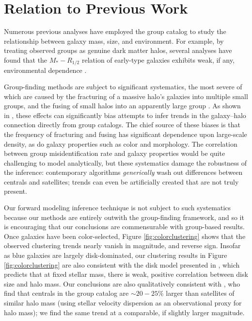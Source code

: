 \documentclass[usenatbib,usegraphicx,letterpaper]{mn2e}
\newcommand{\rhalf}{R_{1/2}}
\newcommand{\mstar}{M_{\ast}}
\begin{document}
\section{Relation to Previous Work}
\label{sec:previous_work}

Numerous previous analyses have employed the \citet{yang_etal05b} group catalog to study the relationship between galaxy mass, size, and environment. For example, by treating observed groups as genuine dark matter halos, several analyses have found that the $\mstar-\rhalf$ relation of early-type galaxies exhibits weak, if any, environmental dependence \citep{weinmann_etal08,huertas_company_etal13b,shankar_etal14}.


Group-finding methods are subject to significant systematics, the most severe of which are caused by the fracturing of a massive halo's galaxies into multiple small groups, and the fusing of small halos into an apparently large group \citep{duarte_mamon14}. As shown in \citet{campbell_etal15}, these effects can significantly bias attempts to infer trends in the galaxy--halo connection directly from group catalogs. The chief source of these  biases is that the frequency of fracturing and fusing has significant dependence upon large-scale density, as do galaxy properties such as color and morphology. The correlation between group misidentification rate and galaxy properties would be quite challenging to model analytically, but these systematics damage the robustness of the inference: contemporary algorithms {\em generically} wash out differences between centrals and satellites; trends can even be artificially created that are not truly present. 

 Our forward modeling inference technique is not subject to such systematics because our methods are entirely outwith the group-finding framework, and so it is encouraging that our conclusions are commensurable with group-based results. Once galaxies have been color-selected, Figure \ref{fig:colorclustering} shows that the observed clustering trends nearly vanish in magnitude, and reverse sign. Insofar as blue galaxies are largely disk-dominated, our clustering results in Figure \ref{fig:colorclustering} are also consistent with the disk model presented in \citet{dutton_etal08,dutton_etal10}, which predicts that at fixed stellar mass, there is weak, positive correlation between disk size and halo mass. Our conclusions are also qualitatively consistent with \citet{spindler_wake17}, who find that centrals in the \citet{yang_etal05a} group catalog are $\sim20-25\%$ larger than satellites of similar halo mass (using stellar velocity dispersion as an observational proxy for halo mass); we find the same trend at a comparable, if slightly larger magnitude.
\end{document}

